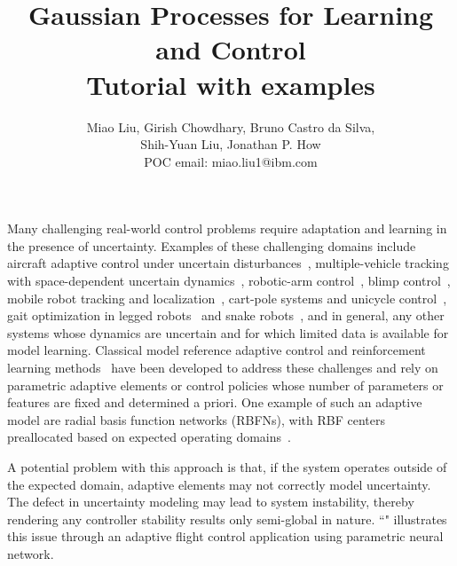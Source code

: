 \documentclass[letterpaper,12pt,peerreviewca,draftcls]{IEEEtran}
\title{Gaussian Processes for Learning and Control\\\Large Tutorial with examples}
\author{Miao Liu, Girish Chowdhary, Bruno Castro da Silva, \\Shih-Yuan Liu, Jonathan P. How\\ POC email: miao.liu1@ibm.com}
\newcommand{\XX}[1]{{\bf \color{orange}{ XX #1 XX}}}
\newcommand{\bX}[1]{\added[id=bc,remark={}]{#1}}
\begin{document}
\maketitle
\CSMsetup
\linenumbers \modulolinenumbers[5] %


Many challenging real-world control problems require adaptation and learning in the presence of uncertainty. Examples of these challenging domains include aircraft adaptive control under uncertain disturbances~\cite{chowdhary2013bayesian,yang2015fault}, multiple-vehicle tracking with space-dependent uncertain dynamics~\cite{Joseph11_AR, wei2014camera}, robotic-arm control~\cite{nguyen2010using}, blimp control~\cite{ko2009gp, ko2007gaussian}, mobile robot tracking and localization~\cite{ko2011learning,GP-local:AAAI2014}, cart-pole systems and unicycle control~\cite{deisenroth2015gaussian}, gait optimization in legged robots~\cite{lizotte2007automatic} and snake robots~\cite{tesch2011using}, and in general, any other systems whose dynamics are uncertain and for which limited data is available for model learning. Classical model reference adaptive control \cite{tao:bk:03,narendra:bk:89,Ioannou:96bk} and reinforcement learning methods~\cite{Sutton_17, busoniu2010reinforcement,vrabie2013optimal,lewis2012reinforcement,bhasin2013novel,vamvoudakis2017game,liu2017adaptive,zhu2017comprehensive} %
have been developed to address these %
challenges and rely on parametric adaptive elements or control policies whose number of parameters or features are fixed and determined a priori. One example of such an adaptive model are radial basis function networks (RBFNs), with RBF centers preallocated based on expected operating domains~\cite{sanner1992gaussian,kim1998high}. 

A potential problem with this approach is that, if the system operates outside of the expected domain, adaptive elements may not correctly model  uncertainty. The defect in uncertainty modeling may lead to system instability, thereby rendering any controller stability results only semi-global in nature. ``" illustrates this issue through an adaptive flight control application using parametric neural network.
\end{document}
